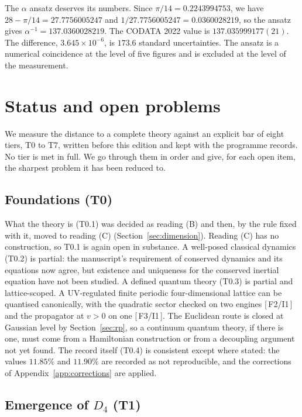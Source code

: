 \documentclass[a4paper,11pt]{article}
\numberwithin{equation}{section}
\theoremstyle{jsplain}
\theoremstyle{jsrem}
\newcommand{\grade}[1]{[\,#1\,]}
\begin{document}
The $\alpha$ ansatz deserves its numbers. Since $\pi/14=0.2243994753$, we have $28-\pi/14=27.7756005247$ and $1/27.7756005247=0.0360028219$, so the ansatz gives $\alpha^{-1}=137.0360028219$. The CODATA 2022 value is $137.035999177(21)$. The difference, $3.645\times10^{-6}$, is $173.6$ standard uncertainties. The ansatz is a numerical coincidence at the level of five figures and is excluded at the level of the measurement.

\section{Status and open problems}\label{sec:status}

We measure the distance to a complete theory against an explicit bar of eight tiers, T0 to T7, written before this edition and kept with the programme records. No tier is met in full. We go through them in order and give, for each open item, the sharpest problem it has been reduced to.

\subsection{Foundations (T0)}

What the theory is (T0.1) was decided as reading (B) and then, by the rule fixed with it, moved to reading (C) (Section~\ref{sec:dimension}). Reading (C) has no construction, so T0.1 is again open in substance. A well-posed classical dynamics (T0.2) is partial: the manuscript's requirement of conserved dynamics and its equations now agree, but existence and uniqueness for the conserved inertial equation have not been studied. A defined quantum theory (T0.3) is partial and lattice-scoped. A UV-regulated finite periodic four-dimensional lattice can be quantised canonically, with the quadratic sector checked on two engines \grade{F2/I1} and the propagator at $v>0$ on one \grade{F3/I1}. The Euclidean route is closed at Gaussian level by Section~\ref{sec:rp}, so a continuum quantum theory, if there is one, must come from a Hamiltonian construction or from a decoupling argument not yet found. The record itself (T0.4) is consistent except where stated: the values $11.85\%$ and $11.90\%$ are recorded as not reproducible, and the corrections of Appendix~\ref{app:corrections} are applied.

\subsection{Emergence of $D_4$ (T1)}
\end{document}
